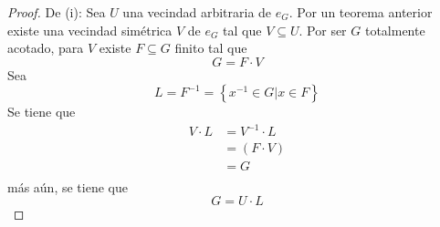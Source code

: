 \documentclass[12pt]{report}
\theoremstyle{largebreak}
\begin{document}
    \begin{proof}
        De (i): Sea $U$ una vecindad arbitraria de $e_G$. Por un teorema anterior existe una vecindad simétrica $V$ de $e_G$ tal que $V\subseteq U$. Por ser $G$ totalmente acotado, para $V$ existe $F\subseteq G$ finito tal que
        \begin{equation*}
            G=F\cdot V
        \end{equation*}
        Sea
        \begin{equation*}
            L=F^{-1}=\left\{x^{-1}\in G \Big|x\in F\right\}
        \end{equation*}
        Se tiene que
        \begin{equation*}
            \begin{split}
                V\cdot L&=V^{-1}\cdot L\\
                &=(F\cdot V)\\
                &=G\\
            \end{split}
        \end{equation*}
        más aún, se tiene que
        \begin{equation*}
            G=U\cdot L
        \end{equation*}


\end{proof}
\end{document}

